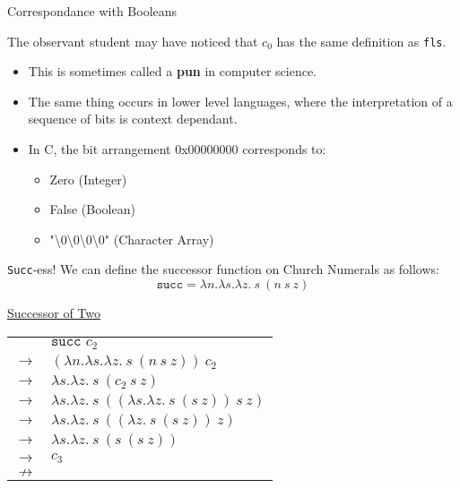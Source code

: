 \documentclass[11pt]{beamer}
\begin{document}
\begin{frame}[fragile=singleslide]{Correspondance with Booleans}

The observant student may have noticed that $c_0$ has the same definition as \texttt{fls}.

\begin{itemize}
\item This is sometimes called a \textbf{pun} in computer science.
\item The same thing occurs in lower level languages, where the interpretation of a sequence of bits is context dependant. 
\item In C, the bit arrangement 0x00000000 corresponds to:
\begin{itemize}
\item Zero (Integer)
\item False (Boolean)
\item "\textbackslash 0\textbackslash 0\textbackslash 0\textbackslash 0" (Character Array)
\end{itemize}
\end{itemize}

\end{frame}

\begin{frame}[fragile=singleslide]{\texttt{Succ}-ess!}
We can define the successor function on Church Numerals as follows:
\begin{equation}
\texttt{succ} = \lambda n. \lambda s. \lambda z.\:s\:(n\:s\:z)
\end{equation}

\begin{center}
\underline{Successor of Two} \\
\begin{tabular}{c l}
& $\texttt{succ } c_2$ \\ 
$\rightarrow$ & $(\lambda n. \lambda s. \lambda z.\:s\:(n\:s\:z))\:c_2$ \\
$\rightarrow$ & $\lambda s. \lambda z.\:s\:(c_2\:s\:z)$ \\
$\rightarrow$ & $\lambda s. \lambda z.\:s\:((\lambda s. \lambda z.\:s\:(s\:z))\:s\:z)$ \\
$\rightarrow$ & $\lambda s. \lambda z.\:s\:((\lambda z.\:s\:(s\:z))\:z)$ \\
$\rightarrow$ & $\lambda s. \lambda z.\:s\:(s\:(s\:z))$ \\
$\rightarrow$ & $c_3$ \\
$\nrightarrow$ & \\
\end{tabular}
\end{center}

\end{frame}
\end{document}
